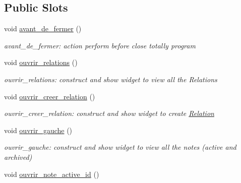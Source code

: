 \subsection*{Public Slots}
\begin{DoxyCompactItemize}
\item 
\mbox{\label{class_interface_a3a82b8958d8fa2dd8239f781c5c92042}} 
void \hyperlink{class_interface_a3a82b8958d8fa2dd8239f781c5c92042}{avant\+\_\+de\+\_\+fermer} ()
\begin{DoxyCompactList}\small\item\em avant\+\_\+de\+\_\+fermer\+: action perform before close totally program \end{DoxyCompactList}\item 
\mbox{\label{class_interface_a94a88ff71e0b2caef92e88972662d4b0}} 
void \hyperlink{class_interface_a94a88ff71e0b2caef92e88972662d4b0}{ouvrir\+\_\+relations} ()
\begin{DoxyCompactList}\small\item\em ouvrir\+\_\+relations\+: construct and show widget to view all the Relations \end{DoxyCompactList}\item 
\mbox{\label{class_interface_ac5a8f808b693fc578f37b303aaf7ff1b}} 
void \hyperlink{class_interface_ac5a8f808b693fc578f37b303aaf7ff1b}{ouvrir\+\_\+creer\+\_\+relation} ()
\begin{DoxyCompactList}\small\item\em ouvrir\+\_\+creer\+\_\+relation\+: construct and show widget to create \hyperlink{class_relation}{Relation} \end{DoxyCompactList}\item 
\mbox{\label{class_interface_ab56822f065a7ef72d1db16964e0cbb4d}} 
void \hyperlink{class_interface_ab56822f065a7ef72d1db16964e0cbb4d}{ouvrir\+\_\+gauche} ()
\begin{DoxyCompactList}\small\item\em ouvrir\+\_\+gauche\+: construct and show widget to view all the notes (active and archived) \end{DoxyCompactList}\item 
\mbox{\label{class_interface_a473b685de72a223d9972a70c0698e314}} 
void \hyperlink{class_interface_a473b685de72a223d9972a70c0698e314}{ouvrir\+\_\+note\+\_\+active\+\_\+id} ()

\end{DoxyCompactItemize}
